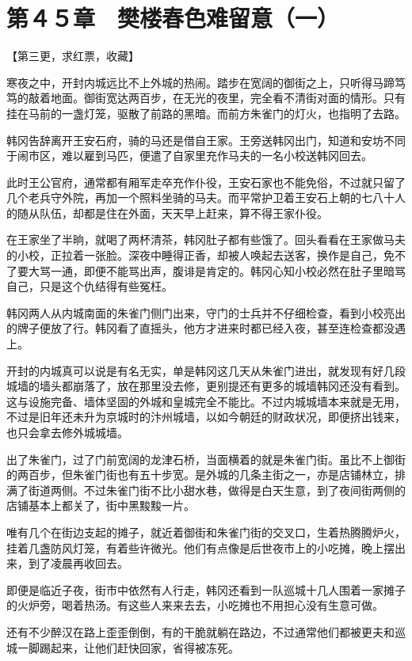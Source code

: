 \section{第４５章　樊楼春色难留意（一）}

【第三更，求红票，收藏】

寒夜之中，开封内城远比不上外城的热闹。踏步在宽阔的御街之上，只听得马蹄笃笃的敲着地面。御街宽达两百步，在无光的夜里，完全看不清街对面的情形。只有挂在马前的一盏灯笼，驱散了前路的黑暗。而前方朱雀门的灯火，也指明了去路。

韩冈告辞离开王安石府，骑的马还是借自王家。王旁送韩冈出门，知道和安坊不同于闹市区，难以雇到马匹，便遣了自家里充作马夫的一名小校送韩冈回去。

此时王公官府，通常都有厢军走卒充作仆役，王安石家也不能免俗，不过就只留了几个老兵守外院，再加一个照料坐骑的马夫。而平常护卫着王安石上朝的七八十人的随从队伍，却都是住在外面，天天早上赶来，算不得王家仆役。

在王家坐了半晌，就喝了两杯清茶，韩冈肚子都有些饿了。回头看看在王家做马夫的小校，正拉着一张脸。深夜中睡得正香，却被人唤起去送客，换作是自己，免不了要大骂一通，即便不能骂出声，腹诽是肯定的。韩冈心知小校必然在肚子里暗骂自己，只是这个仇结得有些冤枉。

韩冈两人从内城南面的朱雀门侧门出来，守门的士兵并不仔细检查，看到小校亮出的牌子便放了行。韩冈看了直摇头，他方才进来时都已经入夜，甚至连检查都没遇上。

开封的内城真可以说是有名无实，单是韩冈这几天从朱雀门进出，就发现有好几段城墙的墙头都崩落了，放在那里没去修，更别提还有更多的城墙韩冈还没有看到。这与设施完备、墙体坚固的外城和皇城完全不能比。不过内城城墙本来就是无用，不过是旧年还未升为京城时的汴州城墙，以如今朝廷的财政状况，即便挤出钱来，也只会拿去修外城城墙。

出了朱雀门，过了门前宽阔的龙津石桥，当面横着的就是朱雀门街。虽比不上御街的两百步，但朱雀门街也有五十步宽。是外城的几条主街之一，亦是店铺林立，排满了街道两侧。不过朱雀门街不比小甜水巷，做得是白天生意，到了夜间街两侧的店铺基本上都关了，街中黑黢黢一片。

唯有几个在街边支起的摊子，就近着御街和朱雀门街的交叉口，生着热腾腾炉火，挂着几盏防风灯笼，有着些许微光。他们有点像是后世夜市上的小吃摊，晚上摆出来，到了凌晨再收回去。

即便是临近子夜，街市中依然有人行走，韩冈还看到一队巡城十几人围着一家摊子的火炉旁，喝着热汤。有这些人来来去去，小吃摊也不用担心没有生意可做。

还有不少醉汉在路上歪歪倒倒，有的干脆就躺在路边，不过通常他们都被更夫和巡城一脚踢起来，让他们赶快回家，省得被冻死。

